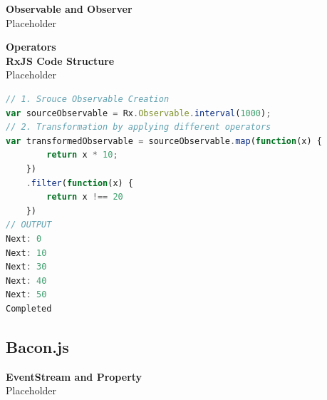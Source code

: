 \textbf{Observable and Observer}\\
Placeholder

\textbf{Operators}
\label{subsec:Operators}\\

\textbf{RxJS Code Structure}\\
Placeholder
\begin{lstlisting}[language=JavaScript, caption=RxJS Simple Example, label={lst:RxJS_Simple_Example}]
// 1. Srouce Observable Creation
var sourceObservable = Rx.Observable.interval(1000);
// 2. Transformation by applying different operators
var transformedObservable = sourceObservable.map(function(x) {
		return x * 10;
	})
	.filter(function(x) {
		return x !== 20
	})
// OUTPUT
Next: 0
Next: 10
Next: 30
Next: 40
Next: 50
Completed
\end{lstlisting}

\subsection{Bacon.js}

\textbf{EventStream and Property}\\
Placeholder

